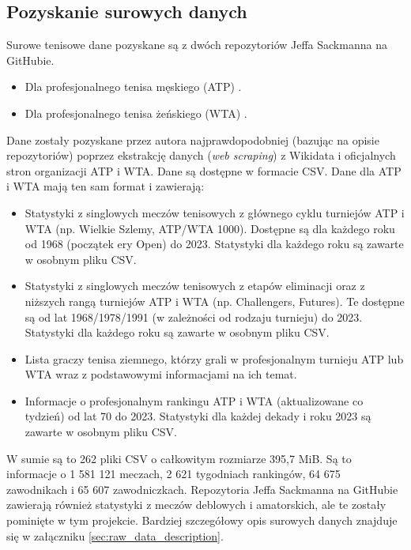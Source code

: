 \documentclass[12pt, a4paper]{article}
\begin{document}
\subsection{Pozyskanie surowych danych} \label{sec:obtain_raw_data}
Surowe tenisowe dane pozyskane są z dwóch repozytoriów Jeffa Sackmanna na GitHubie.
\begin{itemize}
    \item Dla profesjonalnego tenisa męskiego (ATP) \cite{tennis_atp}.
    \item Dla profesjonalnego tenisa żeńskiego (WTA) \cite{tennis_wta}.
\end{itemize}
Dane zostały pozyskane przez autora najprawdopodobniej (bazując na opisie repozytoriów) poprzez ekstrakcję danych (\textit{web scraping}) z Wikidata i oficjalnych stron organizacji ATP i WTA. Dane są dostępne w formacie CSV. Dane dla ATP i WTA mają ten sam format i zawierają:
\begin{itemize}
    \item Statystyki z singlowych meczów tenisowych z głównego cyklu turniejów ATP i WTA (np. Wielkie Szlemy, ATP/WTA 1000). Dostępne są dla każdego roku od 1968 (początek ery Open) do 2023. Statystyki dla każdego roku są zawarte w osobnym pliku CSV.
    \item Statystyki z singlowych meczów tenisowych z etapów eliminacji oraz z niższych rangą turniejów ATP i WTA (np. Challengers, Futures). Te dostępne są od lat 1968/1978/1991 (w zależności od rodzaju turnieju) do 2023. Statystyki dla każdego roku są zawarte w osobnym pliku CSV.
    \item Lista graczy tenisa ziemnego, którzy grali w profesjonalnym turnieju ATP lub WTA wraz z podstawowymi informacjami na ich temat.
    \item Informacje o profesjonalnym rankingu ATP i WTA (aktualizowane co tydzień) od lat 70 do 2023. Statystyki dla każdej dekady i roku 2023 są zawarte w osobnym pliku CSV.
\end{itemize}
W sumie są to 262 pliki CSV o całkowitym rozmiarze 395,7 MiB. Są to informacje o 1 581 121 meczach, 2 621 tygodniach rankingów, 64 675 zawodnikach i 65 607 zawodniczkach. Repozytoria Jeffa Sackmanna na GitHubie zawierają również statystyki z meczów deblowych i amatorskich, ale te zostały pominięte w tym projekcie. Bardziej szczegółowy opis surowych danych znajduje się w załączniku \ref{sec:raw_data_description}.
\end{document}
